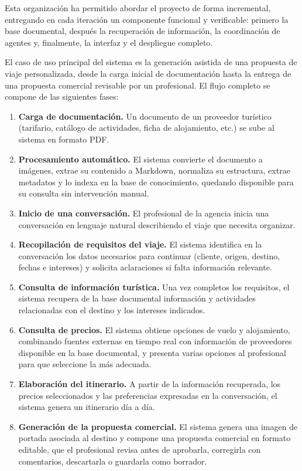 Esta organización ha permitido abordar el proyecto de forma incremental, entregando en cada iteración un componente funcional y verificable: primero la base documental, después la recuperación de información, la coordinación de agentes y, finalmente, la interfaz y el despliegue completo.

El caso de uso principal del sistema es la generación asistida de una propuesta de viaje personalizada, desde la carga inicial de documentación hasta la entrega de una propuesta comercial revisable por un profesional. El flujo completo se compone de las siguientes fases:

\begin{enumerate}
\item \textbf{Carga de documentación.} Un documento de un proveedor turístico (tarifario, catálogo de actividades, ficha de alojamiento, etc.) se sube al sistema en formato PDF.
\item \textbf{Procesamiento automático.} El sistema convierte el documento a imágenes, extrae su contenido a Markdown, normaliza su estructura, extrae metadatos y lo indexa en la base de conocimiento, quedando disponible para su consulta sin intervención manual.
\item \textbf{Inicio de una conversación.} El profesional de la agencia inicia una conversación en lenguaje natural describiendo el viaje que necesita organizar.
\item \textbf{Recopilación de requisitos del viaje.} El sistema identifica en la conversación los datos necesarios para continuar (cliente, origen, destino, fechas e intereses) y solicita aclaraciones si falta información relevante.
\item \textbf{Consulta de información turística.} Una vez completos los requisitos, el sistema recupera de la base documental información y actividades relacionadas con el destino y los intereses indicados.
\item \textbf{Consulta de precios.} El sistema obtiene opciones de vuelo y alojamiento, combinando fuentes externas en tiempo real con información de proveedores disponible en la base documental, y presenta varias opciones al profesional para que seleccione la más adecuada.
\item \textbf{Elaboración del itinerario.} A partir de la información recuperada, los precios seleccionados y las preferencias expresadas en la conversación, el sistema genera un itinerario día a día.
\item \textbf{Generación de la propuesta comercial.} El sistema genera una imagen de portada asociada al destino y compone una propuesta comercial en formato editable, que el profesional revisa antes de aprobarla, corregirla con comentarios, descartarla o guardarla como borrador.
\end{enumerate}


